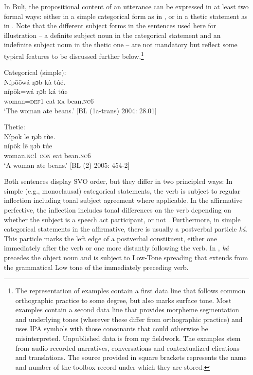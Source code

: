\documentclass[output=paper]{langsci/langscibook}
\begin{document}
In Buli, the propositional content of an utterance can be expressed in at least two formal ways: either in a simple categorical form as in , or in a thetic statement as in . Note that the different subject forms in the sentences used here for illustration – a definite subject noun in the categorical statement and an indefinite subject noun in the thetic one – are not mandatory but reflect some typical features to be discussed further below.\footnote{The representation of examples contain a first data line that follows common orthographic practice to some degree, but also marks surface tone. Most examples contain a second data line that provides morpheme segmentation and underlying tones (wherever these differ from orthographic practice) and uses IPA symbols with those consonants that could otherwise be misinterpreted. Unpublished data is from my fieldwork. The examples stem from audio-recorded narratives, conversations and contextualized elications and translations. The source provided in square brackets represents the name and number of the toolbox record under which they are stored.} 
 
\ea\label{ex:schwarz:5}
 Categorical (simple):  \\
\glll Níp\={o}\={o}wá  ŋɔb  kà  túé.\\
    \textup{níp\={o}k=wá } \textup{ŋɔb}  \textup{ká} \textup{túe}\\
     woman=\textsc{def}1  eat  \textsc{ka}  bean.\textsc{nc}6\\
\glt ‘The woman ate beans.’ [BL (1a-trans) 2004: 28.01]
\z

\ea\label{ex:schwarz:6}
Thetic: \\
\glll Níp\={o}k    l\={e}  ŋɔb  tù\={e}.\\
     \textup{níp\={o}k}    l\={e}  \textup{ŋɔb}  \textup{túe}\\
     woman.\textsc{nc}1  \textsc{con}  eat  bean.\textsc{nc}6\\
\glt ‘A woman ate beans.’ [BL (2) 2005: 454-2]
\z

Both sentences display SVO order, but they differ in two principled ways: In simple (e.g., monoclausal) categorical statements, the verb is subject to regular inflection including tonal subject agreement where applicable. In the affirmative perfective, the inflection includes tonal differences on the verb depending on whether the subject is a speech act participant, or not \citep{Schwarz2007}. Furthermore, in simple categorical statements in the affirmative, there is usually a postverbal particle \textit{ká.} This particle marks the left edge of a postverbal constituent, either one immediately after the verb or one more distantly following the verb. In , \textit{ká} precedes the object noun and is subject to Low-Tone spreading that extends from the grammatical Low tone of the immediately preceding verb.
\end{document}
